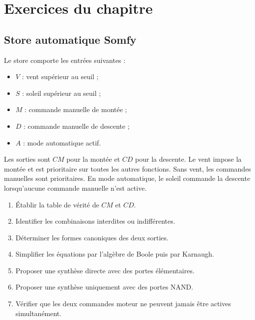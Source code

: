 
\section{Exercices du chapitre}
\label{sec:logique-exercices}

\subsection{Store automatique Somfy}

Le store comporte les entrées suivantes :
\begin{itemize}
  \item $V$ : vent supérieur au seuil ;
  \item $S$ : soleil supérieur au seuil ;
  \item $M$ : commande manuelle de montée ;
  \item $D$ : commande manuelle de descente ;
  \item $A$ : mode automatique actif.
\end{itemize}
Les sorties sont $CM$ pour la montée et $CD$ pour la descente. Le vent impose la montée et est prioritaire sur toutes les autres fonctions. Sans vent, les commandes manuelles sont prioritaires. En mode automatique, le soleil commande la descente lorsqu'aucune commande manuelle n'est active.


\begin{enumerate}
  \item Établir la table de vérité de $CM$ et $CD$.
  \item Identifier les combinaisons interdites ou indifférentes.
  \item Déterminer les formes canoniques des deux sorties.
  \item Simplifier les équations par l'algèbre de Boole puis par Karnaugh.
  \item Proposer une synthèse directe avec des portes élémentaires.
  \item Proposer une synthèse uniquement avec des portes NAND.
  \item Vérifier que les deux commandes moteur ne peuvent jamais être actives simultanément.
\end{enumerate}

